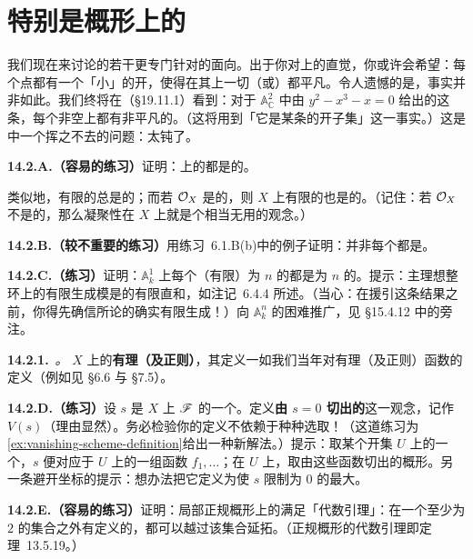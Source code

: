 
\section{特别是概形上的\trLocallyFreeSheaf}

我们现在来讨论\trLocallyFreeSheaf{}的若干更专门针对\trScheme{}的面向。出于你对\trManifold{}上\trLineBundle{}的直觉，你或许会希望：每个点都有一个「小」的开\trNeighborhood，使得在其上一切\trInvertibleSheaf（或\trLocallyFreeSheaf）都平凡。令人遗憾的是，事实并非如此。我们终将在（\S19.11.1）看到：对于 $\mathbb{A}^2_{\mathbb{C}}$ 中由 $y^2-x^3-x=0$ 给出的这条\trCurve，每个非空\trOpenSet{}上都有非平凡的\trInvertibleSheaf。（这将用到「它是某条\emph{\trEllipticCurve}的开子集」这一事实。）这是\trAlgebraicGeometry{}中一个挥之不去的问题：\trZariskiTopology{}太钝了。

\textbf{14.2.A.（容易的练习）}\quad 证明：\trScheme{}上的\trLocallyFreeSheaf{}都是\trQC{}的。

类似地，有限\trRank{}的\trLocallyFreeSheaf{}总是\trFiniteType{}的；而若 $\mathcal{O}_X$ 是\trCoh{}的，则 $X$ 上有限\trRank{}的\trLocallyFreeSheaf{}也是\trCoh{}的。（记住：若 $\mathcal{O}_X$ 不是\trCoh{}的，那么凝聚性在 $X$ 上就是个相当无用的观念。）

\textbf{14.2.B.（较不重要的练习）}\quad 用\mbox{练习~6.1.B(b)}中的例子证明：并非每个\trQCSheaf{}都是\trLocallyFreeSheaf。

\textbf{14.2.C.（练习）}\quad 证明：$\mathbb{A}^1_k$ 上每个（有限）\trRank{}为 $n$ 的\trVectorBundle{}都是\trRank{}为 $n$ 的\trTrivialBundle。提示：主理想整环上的有限生成模是\trCyclicModule{}的有限直和，如注记~6.4.4 所述。（当心：在援引这条结果之前，你得先确信所论的\trModule{}确实有限生成！）向 $\mathbb{A}^n_k$ 的困难推广，见 \S15.4.12 中的旁注。

\textbf{14.2.1.}\ \emph{\trhDefinition{}。}\quad \trScheme{} $X$ 上\trLocallyFreeSheaf{}的\textbf{有理（及正则）\trSection}，其定义一如我们当年对有理（及正则）函数的定义（例如见 \S6.6 与 \S7.5）。

\textbf{14.2.D.（练习）}\quad 设 $s$ 是\trScheme{} $X$ 上\trLocallyFreeSheaf{} $\mathscr{F}$ 的一个\trSection。定义\textbf{由 $s=0$ 切出的\trClosedSubscheme}这一观念，记作 $V(s)$（理由显然）。务必检验你的定义不依赖于种种选取！（这道练习为\cref{ex:vanishing-scheme-definition}给出一种新解法。）提示：取某个开集 $U$ 上的一个\trTrivialization，$s$ 便对应于 $U$ 上的一组函数 $f_1,\dots$；在 $U$ 上，取由这些函数切出的概形。另一条避开坐标的提示：想办法把它定义为使 $s$ 限制为 $0$ 的最大\trClosedSubscheme。

\textbf{14.2.E.（容易的练习）}\quad 证明：局部\trNoetherian{}正规概形上的\trLocallyFreeSheaf{}满足「代数\trHartogs{}引理」：在一个\trCodimension{}至少为 $2$ 的集合之外有定义的\trSection，都可以越过该集合延拓。（\trNoetherian{}正规概形的代数\trHartogs{}引理即定理~13.5.19。）

